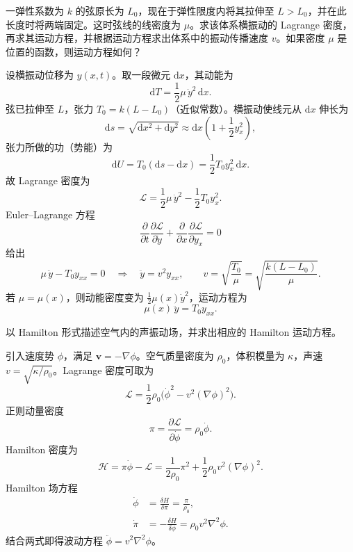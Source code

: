 


\begin{question}
一弹性系数为 \(k\) 的弦原长为 \(L_0\)，现在于弹性限度内将其拉伸至 \(L>L_0\)，并在此长度时将两端固定。这时弦线的线密度为 \(\mu\)。求该体系横振动的 Lagrange 密度，再求其运动方程，并根据运动方程求出体系中的振动传播速度 \(v\)。如果密度 \(\mu\) 是位置的函数，则运动方程如何？
\begin{solution}
设横振动位移为 \(y(x,t)\)。取一段微元 \(\mathrm{d}x\)，其动能为
\[
\mathrm{d}T=\frac12\mu\,\dot y^2\,\mathrm{d}x .
\]
弦已拉伸至 \(L\)，张力 \(T_0=k(L-L_0)\)（近似常数）。横振动使线元从 \(\mathrm{d}x\) 伸长为
\[
\mathrm{d}s=\sqrt{\mathrm{d}x^2+\mathrm{d}y^2}\approx\mathrm{d}x\!\left(1+\frac12 y_x^2\right),
\]
张力所做的功（势能）为
\[
\mathrm{d}U=T_0(\mathrm{d}s-\mathrm{d}x)=\frac12 T_0 y_x^2\,\mathrm{d}x .
\]
故 Lagrange 密度为
\[
\mathcal L=\frac12\mu\,\dot y^2-\frac12 T_0 y_x^2 .
\]
Euler--Lagrange 方程
\[
\frac{\partial}{\partial t}\frac{\partial\mathcal L}{\partial\dot y}
+\frac{\partial}{\partial x}\frac{\partial\mathcal L}{\partial y_x}=0
\]
给出
\[
\mu\,\ddot y-T_0 y_{xx}=0\quad\Longrightarrow\quad
\ddot y=v^2 y_{xx},\qquad
v=\sqrt{\frac{T_0}{\mu}}=\sqrt{\frac{k(L-L_0)}{\mu}} .
\]
若 \(\mu=\mu(x)\)，则动能密度变为 \(\frac12\mu(x)\dot y^2\)，运动方程为
\[
\mu(x)\,\ddot y=T_0 y_{xx}.
\]
\end{solution}
\end{question}

\begin{question}
以 Hamilton 形式描述空气内的声振动场，并求出相应的 Hamilton 运动方程。
\begin{solution}
引入速度势 \(\phi\)，满足 \(\boldsymbol v=-\nabla\phi\)。空气质量密度为 \(\rho_0\)，体积模量为 \(\kappa\)，声速 \(v=\sqrt{\kappa/\rho_0}\)。Lagrange 密度可取为
\[
\mathcal L=\frac12\rho_0\bigl(\dot\phi^2-v^2(\nabla\phi)^2\bigr).
\]
正则动量密度
\[
\pi=\frac{\partial\mathcal L}{\partial\dot\phi}=\rho_0\dot\phi .
\]
Hamilton 密度为
\[
\mathcal H=\pi\dot\phi-\mathcal L
=\frac{1}{2\rho_0}\pi^2+\frac12\rho_0 v^2(\nabla\phi)^2 .
\]
Hamilton 场方程
\[
\begin{aligned}
\dot\phi &= \frac{\delta H}{\delta\pi}= \frac{\pi}{\rho_0},\\
\dot\pi &= -\frac{\delta H}{\delta\phi}= \rho_0 v^2\nabla^2\phi .
\end{aligned}
\]
结合两式即得波动方程 \(\ddot\phi=v^2\nabla^2\phi\)。
\end{solution}
\end{question}


